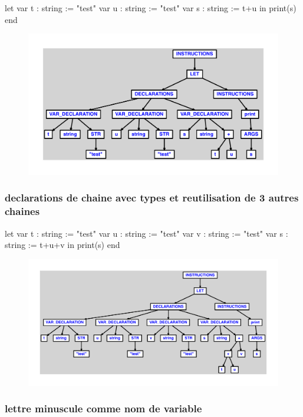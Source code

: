 \documentclass{article}
\begin{document}
\begin{verbatimtab}
let
	var t : string := "test"
	var u : string := "test"
	var s : string := t+u
in
	print(s)
end
\end{verbatimtab}
\begin{figure}[H]\centering\includegraphics[max width=\textwidth]{ast/ast_304.pdf}\end{figure}\subsubsection{declarations de chaine avec types et reutilisation de 3 autres chaines}
\begin{verbatimtab}
let
	var t : string := "test"
	var u : string := "test"
	var v : string := "test"
	var s : string := t+u+v
in
	print(s)
end
\end{verbatimtab}
\begin{figure}[H]\centering\includegraphics[max width=\textwidth]{ast/ast_305.pdf}\end{figure}\subsubsection{lettre minuscule comme nom de variable}
\end{document}
